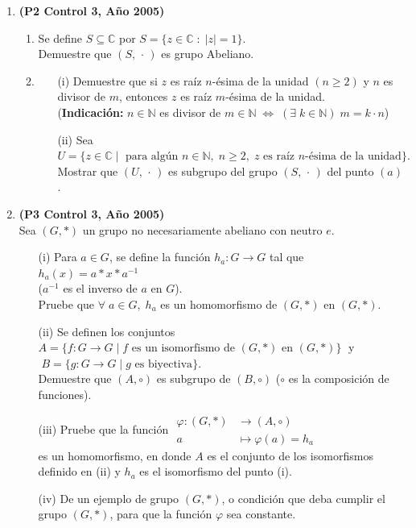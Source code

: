 \documentclass[11pt]{article}
\newcommand{\function}[5]{  \begin{array}{rl}
                                #1: #2 &\longrightarrow #3 \\
                                #4 & \longmapsto #1\left(#4\right)= #5
                            \end{array} }
\newcommand{\N}{\mathbb N}
\newcommand{\C}{\mathbb C}
\theoremstyle{plain}
\theoremstyle{definition}
\begin{document}
\begin{enumerate}
\item \textbf{(P2 Control 3, Año 2005)}
\begin{enumerate}
\item Se define $S\subseteq \C$ por $S=\{z\in\C\;:\;|z|=1\}$.\\
Demuestre que $(S,\,\cdot\,)$ es grupo Abeliano.
\item 
\begin{enumerate}
\item[(i)] Demuestre que si $z$ es raíz $n$-ésima de la unidad $(n\geq 2)$ y $n$ es divisor de $m$, entonces $z$ es raíz $m$-ésima de la unidad.\\
(\textbf{Indicación:} $n\in\N$ es divisor de $m\in\N \; \Longleftrightarrow \; (\exists\;k\in\N)\;m=k\cdot n$)
\item[(ii)] Sea $U=\{z\in\C\;|\;\mbox{ para algún $n\in\N,\;n\geq 2,\;z$ es raíz $n$-ésima de la unidad}\}.$\\
Mostrar que $(U,\,\cdot\,)$ es subgrupo del grupo $(S,\,\cdot\,)$ del punto $(a)$.
\end{enumerate}
\end{enumerate}

\item \textbf{(P3 Control 3, Año 2005)}\\
Sea $(G,*)$ un grupo no necesariamente abeliano con neutro $e$.
\begin{enumerate}
\item[(i)] Para $a\in G$, se define la función $h_a: G\longrightarrow G$ tal que $h_a(x)=a*x*a^{-1}$\\
($a^{-1}$  es el inverso de $a$ en $G$).\\
Pruebe que $\forall\;a\in G,\; h_a$ es un homomorfismo de $(G,*)$ en $(G,*)$.
\item[(ii)] Se definen los conjuntos $A=\{f:G\longrightarrow G \;|\; f \mbox{ es un isomorfismo de $(G,*)$ en $(G,*)$}\}\;$ y $\;B=\{g:G\longrightarrow G\; |\; g \mbox{ es biyectiva}\}$.\\
Demuestre que $(A,\circ)$ es subgrupo de $(B,\circ)$ ($\circ$ es la composición de funciones).
\item[(iii)] Pruebe que la función $\function{\varphi}{(G,*)}{(A,\circ)}{a}{h_a}$ \\ es un homomorfismo, en donde $A$ es el conjunto de los isomorfismos definido en (ii) y $h_a$ es el isomorfismo del punto (i).
\item[(iv)]  De un ejemplo de grupo $(G,*)$, o condición que deba cumplir el grupo $(G,*)$, para que la función $\varphi$ sea constante.
\end{enumerate}




\end{enumerate}
\end{document}
